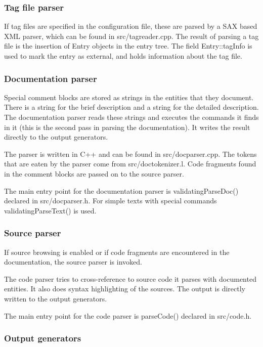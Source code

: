 \subsubsection*{Tag file parser}

If tag files are specified in the configuration file, these are parsed by a SAX based XML parser, which can be found in {\ttfamily src/tagreader.cpp}. The result of parsing a tag file is the insertion of {\ttfamily Entry} objects in the entry tree. The field {\ttfamily Entry::tagInfo} is used to mark the entry as external, and holds information about the tag file.

\subsubsection*{Documentation parser}

Special comment blocks are stored as strings in the entities that they document. There is a string for the brief description and a string for the detailed description. The documentation parser reads these strings and executes the commands it finds in it (this is the second pass in parsing the documentation). It writes the result directly to the output generators.

The parser is written in C++ and can be found in src/docparser.cpp. The tokens that are eaten by the parser come from src/doctokenizer.l. Code fragments found in the comment blocks are passed on to the source parser.

The main entry point for the documentation parser is {\ttfamily validatingParseDoc()} declared in {\ttfamily src/docparser.h}. For simple texts with special commands {\ttfamily validatingParseText()} is used.

\subsubsection*{Source parser}

If source browsing is enabled or if code fragments are encountered in the documentation, the source parser is invoked.

The code parser tries to cross-\/reference to source code it parses with documented entities. It also does syntax highlighting of the sources. The output is directly written to the output generators.

The main entry point for the code parser is {\ttfamily parseCode()} declared in {\ttfamily src/code.h}.

\subsubsection*{Output generators}

